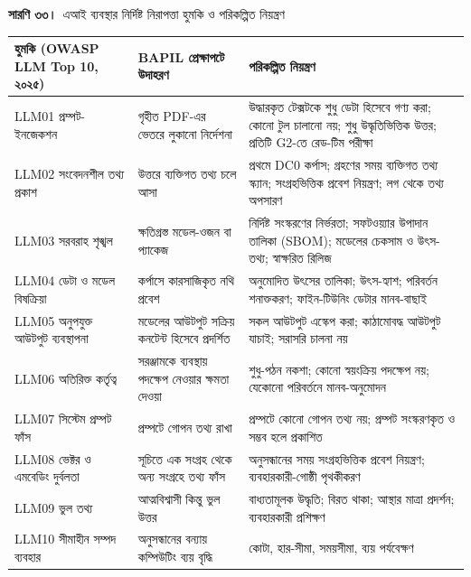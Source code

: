 \documentclass[border=10pt]{standalone}
\begin{document}
\begin{minipage}{17cm}
{\large\bfseries সারণি ৩৩।}\ {\large এআই ব্যবস্থার নির্দিষ্ট নিরাপত্তা হুমকি ও পরিকল্পিত নিয়ন্ত্রণ}\par\vspace{7pt}
\small
{}
\begin{tabularx}{\linewidth}{@{}>{\hsize=0.732\hsize\raggedright\arraybackslash}X>{\hsize=0.805\hsize\raggedright\arraybackslash}X>{\hsize=1.463\hsize\raggedright\arraybackslash}X@{}}
\arrayrulecolor{bapilrule}\toprule
\rowcolor{white}\textbf{হুমকি (OWASP LLM Top 10, ২০২৫)} & \textbf{BAPIL প্রেক্ষাপটে উদাহরণ} & \textbf{পরিকল্পিত নিয়ন্ত্রণ} \\
\midrule
LLM01 প্রম্পট-ইনজেকশন & গৃহীত PDF-এর ভেতরে লুকানো নির্দেশনা & উদ্ধারকৃত টেক্সটকে শুধু ডেটা হিসেবে গণ্য করা; কোনো টুল চালানো নয়; শুধু উদ্ধৃতিভিত্তিক উত্তর; প্রতিটি G2-তে রেড-টিম পরীক্ষা \\
LLM02 সংবেদনশীল তথ্য প্রকাশ & উত্তরে ব্যক্তিগত তথ্য চলে আসা & প্রথমে DC0 কর্পাস; গ্রহণের সময় ব্যক্তিগত তথ্য স্ক্যান; সংগ্রহভিত্তিক প্রবেশ নিয়ন্ত্রণ; লগ থেকে তথ্য অপসারণ \\
LLM03 সরবরাহ শৃঙ্খল & ক্ষতিগ্রস্ত মডেল-ওজন বা প্যাকেজ & নির্দিষ্ট সংস্করণের নির্ভরতা; সফটওয়্যার উপাদান তালিকা (SBOM); মডেলের চেকসাম ও উৎস-তথ্য; স্বাক্ষরিত রিলিজ \\
LLM04 ডেটা ও মডেল বিষক্রিয়া & কর্পাসে কারসাজিকৃত নথি প্রবেশ & অনুমোদিত উৎসের তালিকা; উৎস-হ্যাশ; পরিবর্তন শনাক্তকরণ; ফাইন-টিউনিং ডেটার মানব-বাছাই \\
LLM05 অনুপযুক্ত আউটপুট ব্যবস্থাপনা & মডেলের আউটপুট সক্রিয় কনটেন্ট হিসেবে প্রদর্শিত & সকল আউটপুট এস্কেপ করা; কাঠামোবদ্ধ আউটপুট যাচাই; সরাসরি চালনা নয় \\
LLM06 অতিরিক্ত কর্তৃত্ব & সরঞ্জামকে ব্যবস্থায় পদক্ষেপ নেওয়ার ক্ষমতা দেওয়া & শুধু-পঠন নকশা; কোনো স্বয়ংক্রিয় পদক্ষেপ নয়; যেকোনো পরিবর্তনে মানব-অনুমোদন \\
LLM07 সিস্টেম প্রম্পট ফাঁস & প্রম্পটে গোপন তথ্য রাখা & প্রম্পটে কোনো গোপন তথ্য নয়; প্রম্পট সংস্করণকৃত ও সম্ভব হলে প্রকাশিত \\
LLM08 ভেক্টর ও এমবেডিং দুর্বলতা & সূচিতে এক সংগ্রহ থেকে অন্য সংগ্রহে তথ্য ফাঁস & অনুসন্ধানের সময় সংগ্রহভিত্তিক প্রবেশ নিয়ন্ত্রণ; ব্যবহারকারী-গোষ্ঠী পৃথকীকরণ \\
LLM09 ভুল তথ্য & আত্মবিশ্বাসী কিন্তু ভুল উত্তর & বাধ্যতামূলক উদ্ধৃতি; বিরত থাকা; আস্থার মাত্রা প্রদর্শন; ব্যবহারকারী প্রশিক্ষণ \\
LLM10 সীমাহীন সম্পদ ব্যবহার & অনুসন্ধানের বন্যায় কম্পিউটিং ব্যয় বৃদ্ধি & কোটা, হার-সীমা, সময়সীমা, ব্যয় পর্যবেক্ষণ \\
\bottomrule
\end{tabularx}
\par{}
\end{minipage}
\end{document}
